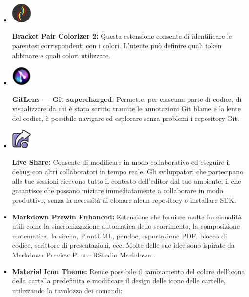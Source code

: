 \begin{itemize}
\item
\begin{minipage}{0.1\textwidth}
\includegraphics[width=1cm] {images/BracketPair.png}
\end{minipage}
\textbf{Bracket Pair Colorizer 2:} Questa estensione consente di identificare le parentesi corrispondenti con i colori. L'utente può definire quali token abbinare e quali colori utilizzare.
\item
\begin{minipage}{0.1\textwidth}
\includegraphics[width=1cm] {images/GitLens.jpg}
\end{minipage}
\textbf{GitLens — Git supercharged:} Permette, per ciascuna parte di codice, di visualizzare da chi è stato scritto tramite le annotazioni Git blame e la lente del codice, è possibile navigare ed esplorare senza problemi i repository Git.
\item
\begin{minipage}{0.1\textwidth}
\includegraphics[width=1cm] {images/LiveShare.png}
\end{minipage}
\textbf{Live Share:} Consente di modificare in modo collaborativo ed eseguire il debug con altri collaboratori in tempo reale. Gli sviluppatori che partecipano alle tue sessioni ricevono tutto il contesto dell'editor dal tuo ambiente, il che garantisce che possano iniziare immediatamente a collaborare in modo produttivo, senza la necessità di clonare alcun repository o installare SDK.
\item
\textbf{Markdown Prewin Enhanced:} Estensione che fornisce molte funzionalità utili come la sincronizzazione automatica dello scorrimento, la composizione matematica, la sirena, PlantUML, pandoc, esportazione PDF, blocco di codice, scrittore di presentazioni, ecc. Molte delle sue idee sono ispirate da Markdown Preview Plus e RStudio Markdown .
\item
\textbf{Material Icon Theme:} Rende possibile il cambiamento del colore dell'icona della cartella predefinita e modificare il design delle icone delle cartelle, utilizzando la tavolozza dei comandi:

\end{itemize}
